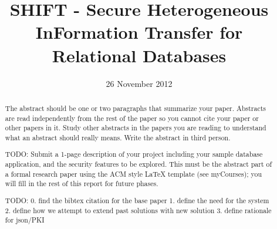 \documentclass{sig-alternate}
\begin{document}
\title{SHIFT - Secure Heterogeneous InFormation Transfer for Relational Databases}
\author{
}
\date{26 November 2012}
\maketitle
\begin{abstract}
  The abstract should be one or two paragraphs that
  summarize your paper. Abstracts are read independently
  from the rest of the paper so you cannot cite your paper
  or other papers in it. Study other abstracts in the papers
  you are reading to understand what an abstract should
  really means. Write the abstract in third person.
  
  TODO: Submit a 1-page description of your project including your sample database 
application, and the security features to be explored. This must be the abstract 
part of a formal research paper using the ACM style LaTeX template (see
myCourses); you will fill in the rest of this report for future phases.

TODO:
0. find the bibtex citation for the base paper
1. define the need for the system
2. define how we attempt to extend past solutions with new solution
3. define rationale for json/PKI
  
\end{abstract}

\begin{comment}
\begin{table}
\centering
\caption{Feelings about Issues}
\begin{tabular}{|l|r|l|} \hline
Flavor&Percentage&Comments\\ \hline
Issue 1 &  10\% & Loved it a lot\\ \hline
Issue 2 &  20\% & Disliked it immensely\\ \hline
Issue 3 &  30\% & Didn't care one bit\\ \hline
Issue 4 &  40\% & Duh?\\ \hline
\end{tabular}
\end{table}

\begin{figure}[htb]
\label{sample graphic}
\begin{center}
\texttt{[image: fly.jpg]}
\caption{A sample black \& white graphic (JPG).}
\end{center}
\end{figure}
\end{comment}



\balance
\end{document}
